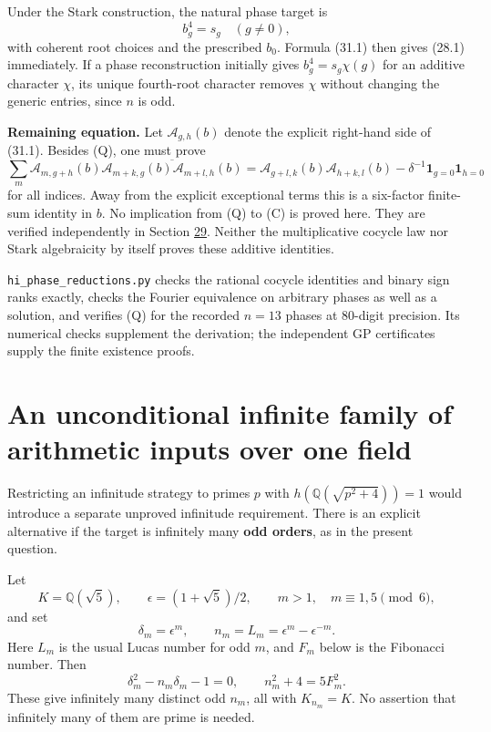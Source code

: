 \documentclass[11pt,reqno]{amsart}
\theoremstyle{plain}
\begin{document}
Under the Stark construction, the natural phase target is
\[
 b_g^4=s_g\quad(g\ne0),
\]
with coherent root choices and the prescribed \(b_0\). Formula (31.1)
then gives (28.1) immediately. If a phase reconstruction initially
gives \(b_g^4=s_g\chi(g)\) for an additive character \(\chi\), its
unique fourth-root character removes \(\chi\) without changing the
generic entries, since \(n\) is odd.

\textbf{Remaining equation.} Let \(\mathcal A_{g,h}(b)\) denote the explicit
right-hand side of (31.1). Besides (Q), one must prove
\begin{equation*}
 \sum_m\mathcal A_{m,g+h}(b)
   \overline{\mathcal A_{m+k,g}(b)\mathcal A_{m+l,h}(b)}
 =\mathcal A_{g+l,k}(b)\mathcal A_{h+k,l}(b)
  -\delta^{-1}\mathbf1_{g=0}\mathbf1_{h=0}
 \tag{C}
\end{equation*}
for all indices. Away from the explicit exceptional terms this is a
six-factor finite-sum identity in \(b\).
No implication from (Q) to (C) is proved here. They are verified
independently in Section \hyperref[sec:29]{29}. Neither the multiplicative cocycle law
nor Stark algebraicity by itself proves these additive identities.

\texttt{hi\_\allowbreak phase\_\allowbreak reductions.py} checks the rational
cocycle identities and binary sign ranks exactly, checks the Fourier
equivalence on arbitrary phases as well as a solution, and verifies
(Q) for the recorded \(n=13\) phases at 80-digit precision. Its
numerical checks supplement the derivation; the independent GP
certificates supply the finite existence proofs.

\section{An unconditional infinite family of arithmetic inputs over one field}\label{sec:32}

Restricting an infinitude strategy to primes \(p\) with
\(h(\mathbb Q(\sqrt{p^2+4}))=1\) would introduce a separate unproved
infinitude requirement. There is an explicit alternative if the target
is infinitely many \textbf{odd orders}, as in the present question.

Let
\[
 K=\mathbb Q(\sqrt5),\qquad \epsilon=(1+\sqrt5)/2,
 \qquad m>1,\quad m\equiv1,5\pmod6,
\]
and set
\[
 \delta_m=\epsilon^m,\qquad n_m=L_m=\epsilon^m-\epsilon^{-m}.
\]
Here \(L_m\) is the usual Lucas number for odd \(m\), and \(F_m\)
below is the Fibonacci number. Then
\[
 \delta_m^2-n_m\delta_m-1=0,\qquad
 n_m^2+4=5F_m^2.
\]
These give infinitely many distinct odd \(n_m\), all with \(K_{n_m}=K\).
No assertion that infinitely many of them are prime is needed.
\end{document}
